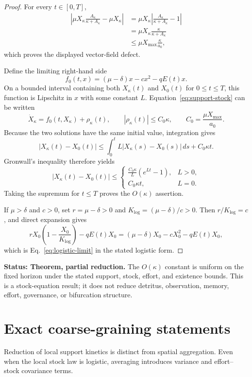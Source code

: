 \documentclass[11pt]{article}
\theoremstyle{definition}
\newcommand{\status}[1]{\par\smallskip\noindent\textbf{Status: #1.}\quad}
\begin{document}
\begin{proof}
For every $t\in[0,T]$,
\begin{align*}
\left|\mu X_\kappa\frac{A_\kappa}{\kappa+A_\kappa}-\mu X_\kappa\right|
&=\mu X_\kappa\left|\frac{A_\kappa}{\kappa+A_\kappa}-1\right|\\
&=\mu X_\kappa\frac{\kappa}{\kappa+A_\kappa}\\
&\le\mu X_{\max}\frac{\kappa}{a_0},
\end{align*}
which proves the displayed vector-field defect.

Define the limiting right-hand side
\[
f_0(t,x)=(\mu-\delta)x-cx^2-qE(t)x.
\]
On a bounded interval containing both $X_\kappa(t)$ and $X_0(t)$ for $0\le t\le T$, this function is Lipschitz in $x$ with some constant $L$. Equation~\eqref{eq:support-stock} can be written
\[
\dot X_\kappa=f_0(t,X_\kappa)+\rho_\kappa(t),
\qquad
|\rho_\kappa(t)|\le C_0\kappa,
\qquad
C_0=\frac{\mu X_{\max}}{a_0}.
\]
Because the two solutions have the same initial value, integration gives
\[
|X_\kappa(t)-X_0(t)|
\le\int_0^tL|X_\kappa(s)-X_0(s)|\,ds+C_0\kappa t.
\]
Gronwall's inequality therefore yields
\[
|X_\kappa(t)-X_0(t)|
\le
\begin{cases}
\displaystyle \frac{C_0\kappa}{L}(e^{Lt}-1),&L>0,\\[2mm]
C_0\kappa t,&L=0.
\end{cases}
\]
Taking the supremum for $t\le T$ proves the $O(\kappa)$ assertion.

If $\mu>\delta$ and $c>0$, set $r=\mu-\delta>0$ and $K_{\log}=(\mu-\delta)/c>0$. Then $r/K_{\log}=c$, and direct expansion gives
\[
rX_0\left(1-\frac{X_0}{K_{\log}}\right)-qE(t)X_0
=(\mu-\delta)X_0-cX_0^2-qE(t)X_0,
\]
which is Eq.~\eqref{eq:logistic-limit} in the stated logistic form.
\end{proof}

\status{Theorem, partial reduction} The $O(\kappa)$ constant is uniform on the fixed horizon under the stated support, stock, effort, and existence bounds. This is a stock-equation result; it does not reduce detritus, observation, memory, effort, governance, or bifurcation structure.

\section{Exact coarse-graining statements}

Reduction of local support kinetics is distinct from spatial aggregation. Even when the local stock law is logistic, averaging introduces variance and effort--stock covariance terms.
\end{document}
